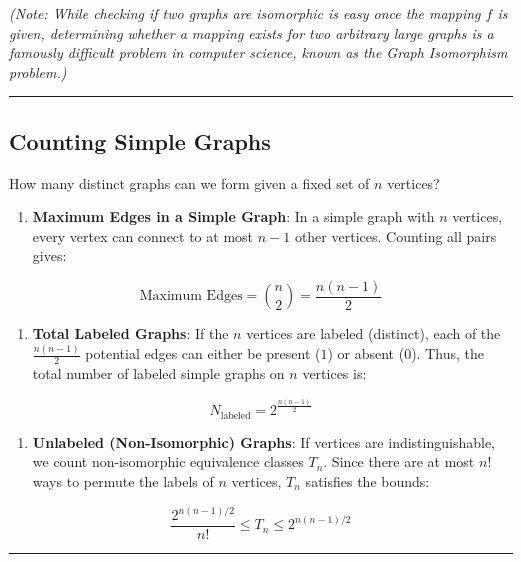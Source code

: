 \documentclass[
]{book}
\providecommand{\tightlist}{%
  \setlength{\itemsep}{0pt}\setlength{\parskip}{0pt}}
\theoremstyle{definition}
\theoremstyle{definition}
\theoremstyle{definition}
\theoremstyle{definition}
\theoremstyle{remark}
\begin{document}
\emph{(Note: While checking if two graphs are isomorphic is easy once the mapping \(f\) is given, determining whether a mapping exists for two arbitrary large graphs is a famously difficult problem in computer science, known as the Graph Isomorphism problem.)}

\begin{center}\rule{0.5\linewidth}{0.5pt}\end{center}

\subsection{Counting Simple Graphs}\label{counting-simple-graphs}

How many distinct graphs can we form given a fixed set of \(n\) vertices?

\begin{enumerate}
\def\labelenumi{\arabic{enumi}.}
\tightlist
\item
  \textbf{Maximum Edges in a Simple Graph}:
  In a simple graph with \(n\) vertices, every vertex can connect to at most \(n-1\) other vertices. Counting all pairs gives:
\end{enumerate}

\[\text{Maximum Edges} = \binom{n}{2} = \frac{n(n-1)}{2}\]

\begin{enumerate}
\def\labelenumi{\arabic{enumi}.}
\setcounter{enumi}{1}
\tightlist
\item
  \textbf{Total Labeled Graphs}:
  If the \(n\) vertices are labeled (distinct), each of the \(\frac{n(n-1)}{2}\) potential edges can either be present (\(1\)) or absent (\(0\)). Thus, the total number of labeled simple graphs on \(n\) vertices is:
\end{enumerate}

\[N_{\text{labeled}} = 2^{\frac{n(n-1)}{2}}\]

\begin{enumerate}
\def\labelenumi{\arabic{enumi}.}
\setcounter{enumi}{2}
\tightlist
\item
  \textbf{Unlabeled (Non-Isomorphic) Graphs}:
  If vertices are indistinguishable, we count non-isomorphic equivalence classes \(T_n\). Since there are at most \(n!\) ways to permute the labels of \(n\) vertices, \(T_n\) satisfies the bounds:
\end{enumerate}

\[\frac{2^{n(n-1)/2}}{n!} \le T_n \le 2^{n(n-1)/2}\]

\begin{center}\rule{0.5\linewidth}{0.5pt}\end{center}
\end{document}
